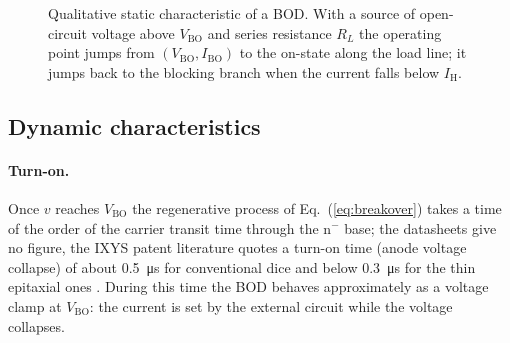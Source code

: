 \documentclass[11pt,a4paper]{article}
\newcommand{\Vbo}{V_{\mathrm{BO}}}
\newcommand{\Ibo}{I_{\mathrm{BO}}}
\newcommand{\Ih}{I_{\mathrm{H}}}
\newcommand{\Vh}{V_{\mathrm{H}}}
\newcommand{\Vto}{V_{\mathrm{T0}}}
\newcommand{\rT}{r_{\mathrm{T}}}
\begin{document}
\begin{figure}[htb]
\centering
{}
\caption{Qualitative static characteristic of a BOD. With a source of open-circuit voltage above $\Vbo$ and series resistance $R_L$ the operating point jumps from $(\Vbo,\Ibo)$ to the on-state along the load line; it jumps back to the blocking branch when the current falls below $\Ih$.}
\label{fig:iv_sketch}
\end{figure}

\subsection{Dynamic characteristics}
\paragraph{Turn-on.} Once $v$ reaches $\Vbo$ the regenerative process of Eq.~(\ref{eq:breakover}) takes a time of the order of the carrier transit time through the n$^-$ base; the datasheets give no figure, the IXYS patent literature quotes a turn-on time (anode voltage collapse) of about \SI{0.5}{\micro\second} for conventional dice and below \SI{0.3}{\micro\second} for the thin epitaxial ones \cite{ixyspatent}. During this time the BOD behaves approximately as a voltage clamp at $\Vbo$: the current is set by the external circuit while the voltage collapses.
\end{document}
